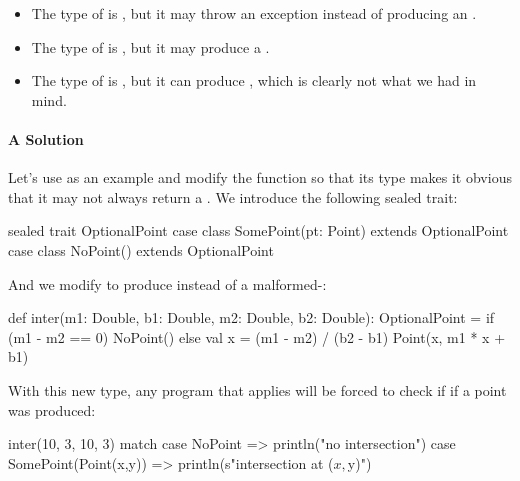 \documentclass{book}
\begin{document}
\begin{itemize}

  \item The type of  is
  , but it may throw an exception instead of producing an .

  \item The type of  is , but it
  may produce a .

  \item The type of  is ,
  but it can produce , which is clearly not what we
  had in mind.

\end{itemize}

\paragraph{A Solution}

Let's use  as an example and modify the function so that its type
makes it obvious that it may not always return a . We introduce
the following sealed trait:

\begin{scalacode}
sealed trait OptionalPoint
case class SomePoint(pt: Point) extends OptionalPoint
case class NoPoint() extends OptionalPoint
\end{scalacode}

And we modify  to produce  instead of a malformed-:

\begin{scalacode}
def inter(m1: Double, b1: Double, m2: Double, b2: Double): OptionalPoint = {
  if (m1 - m2 == 0) {
    NoPoint()
  }
  else {
    val x = (m1 - m2) / (b2 - b1)
    Point(x, m1 * x + b1)
  }
}
\end{scalacode}

With this new type, any program that applies  will be forced to check if
if a point was produced:

\begin{scalacode}
  inter(10, 3, 10, 3) match {
    case NoPoint => println("no intersection")
    case SomePoint(Point(x,y)) => println(s"intersection at ($x, $y)")
  }
\end{scalacode}
\end{document}
